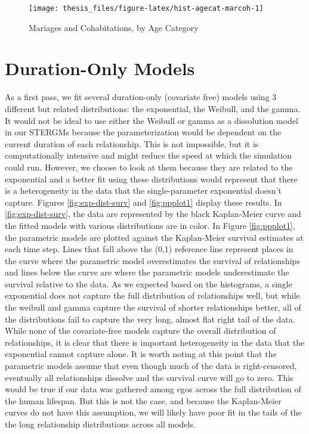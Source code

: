\documentclass [11pt, proquest] {uwthesis}[2015/03/03]
\begin{document}
\begin{figure}

{\centering \texttt{[image: thesis\_files/figure-latex/hist-agecat-marcoh-1]} 

}

\caption{Mariages and Cohabitations, by Age Category}\label{fig:hist-agecat-marcoh}
\end{figure}
\hypertarget{duration-only-models}{%
\section{Duration-Only Models}\label{duration-only-models}}

As a first pass, we fit several duration-only (covariate free) models using 3 different but related distributions: the exponential, the Weibull, and the gamma. It would not be ideal to use either the Weibull or gamma as a dissolution model in our STERGMs because the parameterization would be dependent on the current duration of each relationship. This is not impossible, but it is computationally intensive and might reduce the speed at which the simulation could run. However, we choose to look at them because they are related to the exponential and a better fit using these distributions would represent that there is a heterogeneity in the data that the single-parameter exponential doesn't capture. Figures \ref{fig:exp-dist-surv} and \ref{fig:ppplot1} display these results. In \ref{fig:exp-dist-surv}, the data are represented by the black Kaplan-Meier curve and the fitted models with various distributions are in color. In Figure \ref{fig:ppplot1}, the parametric models are plotted against the Kaplan-Meier survival estimates at each time step. Lines that fall above the (0,1) reference line represent places in the curve where the parametric model overestimates the survival of relationships and lines below the curve are where the parametric models underestimate the survival relative to the data. As we expected based on the histograms, a single exponential does not capture the full distribution of relationships well, but while the weibull and gamma capture the survival of shorter relationships better, all of the distributions fail to capture the very long, almost flat right tail of the data. While none of the covariate-free models capture the overall distribution of relationships, it is clear that there is important heterogeneity in the data that the exponential cannot capture alone. It is worth noting at this point that the parametric models assume that even though much of the data is right-censored, eventually all relationships dissolve and the survival curve will go to zero. This would be true if our data was gathered among egos across the full distribution of the human lifespan. But this is not the case, and because the Kaplan-Meier curves do not have this assumption, we will likely have poor fit in the tails of the the long relationship distributions across all models.
\end{document}
